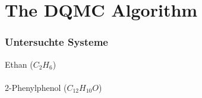 \documentclass{beamer}
\begin{document}
\section{The DQMC Algorithm}
\begin{frame}
\frametitle{Untersuchte Systeme}
\begin{multicols}{2}
    \begin{center}
    Ethan ($C_2 H_6$)\\
	\\
	2-Phenylphenol ($C_{12} H_{10} O$)\\
	\\

\end{center}
\end{multicols}
\end{frame}
\end{document}
